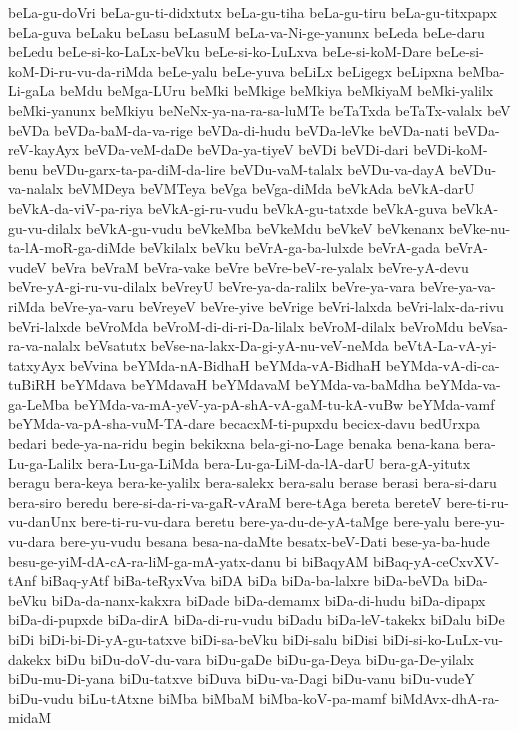 {beLa-gu-doVri
beLa-gu-ti-didxtutx
beLa-gu-tiha
beLa-gu-tiru
beLa-gu-titxpapx
beLa-guva
beLaku
beLasu
beLasuM
beLa-va-Ni-ge-yanunx
beLeda
beLe-daru
beLedu
beLe-si-ko-LaLx-beVku
beLe-si-ko-LuLxva
beLe-si-koM-Dare
beLe-si-koM-Di-ru-vu-da-riMda
beLe-yalu
beLe-yuva
beLiLx
beLigegx
beLipxna
beMba-Li-gaLa
beMdu
beMga-LUru
beMki
beMkige
beMkiya
beMkiyaM
beMki-yalilx
beMki-yanunx
beMkiyu
beNeNx-ya-na-ra-sa-luMTe
beTaTxda
beTaTx-valalx
beV
beVDa
beVDa-baM-da-va-rige
beVDa-di-hudu
beVDa-leVke
beVDa-nati
beVDa-reV-kayAyx
beVDa-veM-daDe
beVDa-ya-tiyeV
beVDi
beVDi-dari
beVDi-koM-benu
beVDu-garx-ta-pa-diM-da-lire
beVDu-vaM-talalx
beVDu-va-dayA
beVDu-va-nalalx
beVMDeya
beVMTeya
beVga
beVga-diMda
beVkAda
beVkA-darU
beVkA-da-viV-pa-riya
beVkA-gi-ru-vudu
beVkA-gu-tatxde
beVkA-guva
beVkA-gu-vu-dilalx
beVkA-gu-vudu
beVkeMba
beVkeMdu
beVkeV
beVkenanx
beVke-nu-ta-lA-moR-ga-diMde
beVkilalx
beVku
beVrA-ga-ba-lulxde
beVrA-gada
beVrA-vudeV
beVra
beVraM
beVra-vake
beVre
beVre-beV-re-yalalx
beVre-yA-devu
beVre-yA-gi-ru-vu-dilalx
beVreyU
beVre-ya-da-ralilx
beVre-ya-vara
beVre-ya-va-riMda
beVre-ya-varu
beVreyeV
beVre-yive
beVrige
beVri-lalxda
beVri-lalx-da-rivu
beVri-lalxde
beVroMda
beVroM-di-di-ri-Da-lilalx
beVroM-dilalx
beVroMdu
beVsa-ra-va-nalalx
beVsatutx
beVse-na-lakx-Da-gi-yA-nu-veV-neMda
beVtA-La-vA-yi-tatxyAyx
beVvina
beYMda-nA-BidhaH
beYMda-vA-BidhaH
beYMda-vA-di-ca-tuBiRH
beYMdava
beYMdavaH
beYMdavaM
beYMda-va-baMdha
beYMda-va-ga-LeMba
beYMda-va-mA-yeV-ya-pA-shA-vA-gaM-tu-kA-vuBw
beYMda-vamf
beYMda-va-pA-sha-vuM-TA-dare
becacxM-ti-pupxdu
becicx-davu
bedUrxpa
bedari
bede-ya-na-ridu
begin
bekikxna
bela-gi-no-Lage
benaka
bena-kana
bera-Lu-ga-Lalilx
bera-Lu-ga-LiMda
bera-Lu-ga-LiM-da-lA-darU
bera-gA-yitutx
beragu
bera-keya
bera-ke-yalilx
bera-salekx
bera-salu
berase
berasi
bera-si-daru
bera-siro
beredu
bere-si-da-ri-va-gaR-vAraM
bere-tAga
bereta
bereteV
bere-ti-ru-vu-danUnx
bere-ti-ru-vu-dara
beretu
bere-ya-du-de-yA-taMge
bere-yalu
bere-yu-vu-dara
bere-yu-vudu
besana
besa-na-daMte
besatx-beV-Dati
bese-ya-ba-hude
besu-ge-yiM-dA-cA-ra-liM-ga-mA-yatx-danu
bi
biBaqyAM
biBaq-yA-ceCxvXV-tAnf
biBaq-yAtf
biBa-teRyxVva
biDA
biDa
biDa-ba-lalxre
biDa-beVDa
biDa-beVku
biDa-da-nanx-kakxra
biDade
biDa-demamx
biDa-di-hudu
biDa-dipapx
biDa-di-pupxde
biDa-dirA
biDa-di-ru-vudu
biDadu
biDa-leV-takekx
biDalu
biDe
biDi
biDi-bi-Di-yA-gu-tatxve
biDi-sa-beVku
biDi-salu
biDisi
biDi-si-ko-LuLx-vu-dakekx
biDu
biDu-doV-du-vara
biDu-gaDe
biDu-ga-Deya
biDu-ga-De-yilalx
biDu-mu-Di-yana
biDu-tatxve
biDuva
biDu-va-Dagi
biDu-vanu
biDu-vudeY
biDu-vudu
biLu-tAtxne
biMba
biMbaM
biMba-koV-pa-mamf
biMdAvx-dhA-ra-midaM
}

